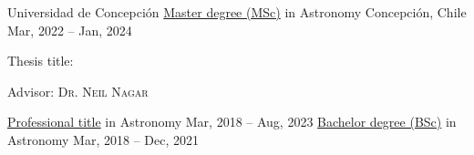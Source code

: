 
\begin{cventries}

  \cventry
    {Universidad de Concepción}
    {\href{https://joacoh.github.io/files/Magister_Astronomia.PDF}{Master degree (MSc)} in Astronomy}
    {Concepción, Chile}
    {Mar, 2022 -- Jan, 2024}
    {
      \begin{cvitems}
        \item{Thesis title: }
        \item{Advisor: \textsc{Dr. Neil Nagar}}
      \end{cvitems}
      \vspace{1em}
    }
  \cventryprevrole
    {\href{https://joacoh.github.io/files/Titulo_Astronomia.PDF}{Professional title} in Astronomy}
    {Mar, 2018 -- Aug, 2023}
    {}
  \cventryprevrole
    {\href{https://joacoh.github.io/files/Licenciatura_Astronomia.pdf}{Bachelor degree (BSc)} in Astronomy}
    {Mar, 2018 -- Dec, 2021}
    {}

    

\end{cventries}
